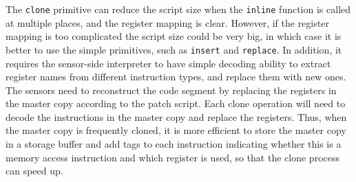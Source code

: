 The {\tt clone} primitive can reduce the script size when the {\tt inline} function is
called at multiple places, and the register mapping is clear. However, if the register mapping
is too complicated the script size could be very big, in which case it is better to use the simple primitives, such as {\tt insert} and {\tt replace}. In addition, it requires the sensor-side interpreter to have simple decoding ability to extract register names from different instruction types, and replace them with new ones. 
The sensors need to reconstruct the code segment
by replacing the registers in the master copy according to the patch script.
Each clone operation will need to decode the instructions in the master copy and
replace the registers. Thus, when the master copy is frequently cloned, it is more
efficient to store the master copy in a storage buffer and add tags
to each instruction indicating whether this is a memory access instruction and
which register is used, so that the clone process can speed up.





